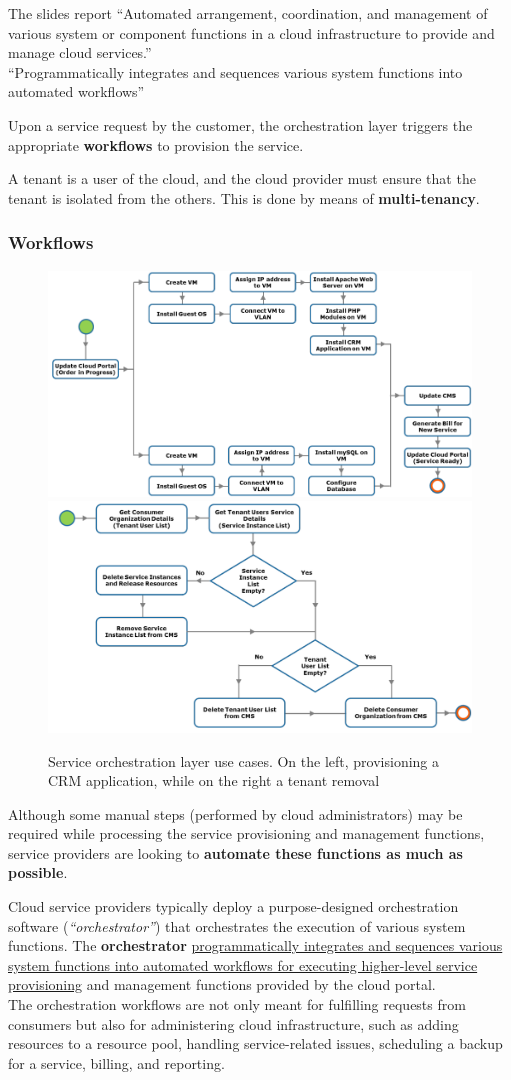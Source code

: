 The slides report ``Automated arrangement, coordination, and management of various system or component functions in a cloud infrastructure to provide and manage cloud services.''\\
``Programmatically integrates and sequences various system functions into automated workflows''

Upon a service request by the customer, the orchestration layer triggers the appropriate \textbf{workflows} to provision the service.\\

\begin{definition}[Tenant] A tenant is a user of the cloud, and the cloud provider must ensure that the tenant is isolated from the others. This is done by means of \textbf{multi-tenancy}.
\end{definition}
\subsubsection*{Workflows}
\begin{figure}[htbp]
   \centering
   \includegraphics[width=0.45\columnwidth]{images/serviceorchestration1.png}
   \includegraphics[width=0.45\columnwidth]{images/serviceorchestration2.png}
   \caption{Service orchestration layer use cases. On the left, provisioning a CRM application, while on the right a tenant removal}
   \label{fig:serviceorchestration}
\end{figure}

Although some manual steps (performed by cloud administrators) may be
required while processing the service provisioning and management
functions, service providers are looking to \textbf{automate these
functions as much as possible}.

Cloud service providers typically deploy a purpose-designed orchestration software (\textit{``orchestrator''}) that orchestrates the execution of various system functions.
The \textbf{orchestrator} \ul{programmatically integrates and sequences various system functions into automated workflows for executing higher-level service provisioning} and management functions provided by the cloud portal.\\
The orchestration workflows are not only meant for fulfilling requests from consumers but also for administering cloud infrastructure, such as adding resources to a resource pool, handling service-related issues, scheduling a backup for a service, billing, and reporting.

